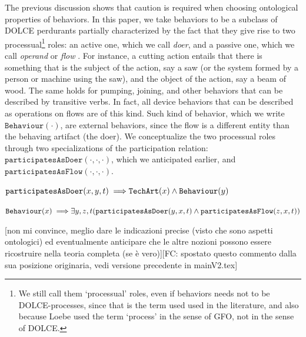 \documentclass[sw]{iosart2x}
\newcommand{\bflist}{\begin{list}{}{\setlength{\topsep}{2mm}\setlength{\partopsep}{0mm}\setlength{\parsep}{0mm}\setlength{\leftmargin}{9mm}\setlength{\labelwidth}{8mm}}}
\newcommand{\eflist}{\end{list}}
\newcommand{\AxLabel}{\textrm{a}}
\newcounter{cntax}
\newcommand{\myax}[1]{\refstepcounter{cntax}\begin{small}{\bf \AxLabel\thecntax\label{ax:#1}}\end{small}}
\newcommand{\generalStyle}[1]{\texttt{#1}}
\newcommand{\uniRel}[2]{\generalStyle{#1}(#2)}
\newcommand{\triRel}[4]{\generalStyle{#1}(#2,#3,#4)}
\newcommand{\myfi}{\hspace{0.9mm} \Longrightarrow}
\newcommand{\DOLCE}{\textsc{DOLCE}\xspace} %
\newcommand{\TechArt}[1]{\uniRel{TechArt}{#1}}
\newcommand{\BehaviourConcrete}[1]{\uniRel{Behaviour}{#1}}
\newcommand{\participateAsDoer}[3]{\triRel{participatesAsDoer}{#1}{#2}{#3}}
\newcommand{\participateAsFlow}[3]{\triRel{participatesAsFlow}{#1}{#2}{#3}}
\newcommand{\firstTimeKeyWord}[1]{\textit{#1}}
\newcommand{\quotes}[1]{`#1'}
\newcommand{\TODO}[1]{{\color{red} #1}}
\begin{document}
The previous discussion shows that caution is required when choosing ontological properties of behaviors. 
In this paper, we take behaviors to be a subclass of \DOLCE perdurants partially characterized by the fact that they give rise to two processual\footnote{We still call them \quotes{processual} roles, even if behaviors needs not to be \DOLCE-processes, since that is the term used used in the literature, and also because Loebe used the term \quotes{process} in the sense of GFO, not in the sense of \DOLCE \cite{loebeAbstractVsSocial2007}.} roles: an active one, which we call \firstTimeKeyWord{doer}, and a passive one, which we call \firstTimeKeyWord{operand} or \firstTimeKeyWord{flow} \cite{pahl_engineering_2007}. 
For instance, a cutting action entails that there is something that is the subject of the action, say a saw (or the system formed by a person or machine using the saw), and the object of the action, say a beam of wood.
The same holds for pumping, joining, and other behaviors that can be described by transitive verbs. 
In fact, all device behaviors that can be described as operations on flows are of this kind. 
Such kind of behavior, which we write $\BehaviourConcrete{\cdot}$, are external behaviors, since the flow is a different entity than the behaving artifact (the doer).
We conceptualize the two processual roles through two specializations of the participation relation: $\participateAsDoer{\cdot}{\cdot}{\cdot}$, which we anticipated earlier, and $\participateAsFlow{\cdot}{\cdot}{\cdot}$. 
\bflist
  \item[\myax{participateAsDoerRage}]  $ \participateAsDoer{x}{y}{t} \myfi \TechArt{x} \land \BehaviourConcrete{y} $
  \item[\myax{processualRoles}] $ \BehaviourConcrete{x} \myfi \exists y,z,t(\participateAsDoer{y}{x}{t} \land \participateAsFlow{z}{x}{t}) $ 
\eflist
\TODO{[non mi convince, meglio dare le indicazioni precise (visto che sono aspetti ontologici) ed eventualmente anticipare che le altre nozioni possono essere ricostruire nella teoria completa (se è vero)][FC: spostato questo commento dalla sua posizione originaria, vedi versione precedente in mainV2.tex]}
\end{document}
